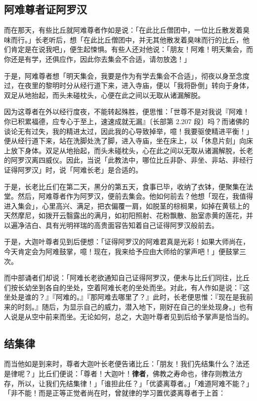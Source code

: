 \subsection*{阿难尊者证阿罗汉}

而在那天，有些比丘就阿难尊者作如是说：「在此比丘僧团中，一位比丘散发着臭味而行。」长老听后，想「在此比丘僧团中，并无其他散发着臭味而行的比丘，他们肯定是在说我吧」，便生起悚惧。有些人还对他说：「朋友！阿难！明天集会，而你还是有学，还俱应作，因此你去集会不合适，请勿放逸！」

于是，阿难尊者想「明天集会，我要是作为有学去集会不合适」，彻夜以身至念度过，在夜里的黎明时分从经行道下来，进入寺庙，便以「我将卧倒」转向于身体，双足从地抬起，而头未碰枕头，心便在此之间以无取从诸漏解脱。

因为这尊者在外以经行度夜，不能转起殊胜，便思惟：「世尊不是对我说『阿难！你已积累福德，应专心于至上，速速成就无漏』{\bluefootnotesize 〔长部第 2.207 段〕}吗？而诸佛的谈论无有过失，我的精进太过，因此我的心导致掉举，噫！我要驱使精进平衡！」便从经行道下来，站在洗脚处洗了脚，进入寺庙，坐在床上，以「休息片刻」向床上放下身体。双足从地抬起，而头未碰枕头，心在此之间以无取从诸漏解脱，长老的阿罗汉离四威仪。因此，当说「此教法中，哪位比丘非卧、非坐、非站、非经行证得阿罗汉」时，说「阿难长老」是合适的。

于是，长老比丘们在第二天，黑分的第五天，食事已毕，收纳了衣钵，便聚集在法堂。然后，阿难尊者作为阿罗汉，便前去集会。他如何前去？他想「现在，我值得进入集会」，心里高兴、满足，把衣偏覆一肩，如脱茎的棕榈果，如掉在黄毯上的天然摩尼，如拨开云翳露出的满月，如初阳照射、花粉飘散、胎室赤黄的莲花，并以遍净洁白、具有光明祥瑞的高贵面容告知着自己证得阿罗汉般前去。

于是，大迦叶尊者见到后便想：「证得阿罗汉的阿难君真是光彩！如果大师尚在，今天肯定会为阿难鼓掌，噫！现在，我来给予应由大师给的掌声吧！」便鼓掌三次。

而中部诵者们却说：「阿难长老欲通知自己证得阿罗汉，便未与比丘们同往，比丘们按长幼坐到各自的坐处，空着阿难长老的坐处而坐。对此，有人作如是说：『这坐处是谁的？』『阿难的。』『那阿难去哪里了？』此时，长老便思惟：『现在是我前来的时刻。』随后，为显示自己的威力，潜入地下，刚好在自己的坐处现身。」也有人说是从空中前来而坐。无论如何，总之，大迦叶尊者见到后给予掌声是恰当的。

\subsection*{结集律}

而当他如是到来时，尊者大迦叶长老便告诸比丘：「朋友！我们先结集什么？法还是律呢？」比丘们便说：「尊者！大迦叶！\textbf{律者}，佛教之寿命也，律存则教法方存，所以，让我们先结集律！」「谁担此任？」「优婆离尊者。」「难道阿难不能？」「非不能！而是正等正觉者尚在时，曾就律的学习置优婆离尊者于上首：

